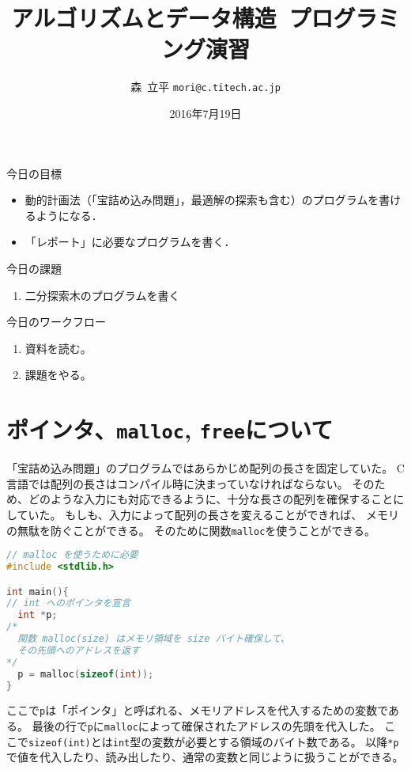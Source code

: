 \documentclass[a4paper,twoside,onecolumn,openany,article]{memoir}
\title{アルゴリズムとデータ構造~プログラミング演習}
\date{2016年7月19日}
\author{森~立平 \texttt{mori@c.titech.ac.jp}}
\theoremstyle{remark}
\begin{document}
\maketitle

\noindent
今日の目標
\begin{itemize}
\item 動的計画法（「宝詰め込み問題」，最適解の探索も含む）のプログラムを書けるようになる．
\item 「レポート」に必要なプログラムを書く．
\end{itemize}

\noindent
今日の課題
\begin{enumerate}
\item 二分探索木のプログラムを書く
\end{enumerate}

\vspace{.5em}
\noindent
今日のワークフロー
\begin{enumerate}
\item 資料を読む。
\item 課題をやる。
\end{enumerate}

\section{ポインタ、\texttt{malloc}, \texttt{free}について}
「宝詰め込み問題」のプログラムではあらかじめ配列の長さを固定していた。
C言語では配列の長さはコンパイル時に決まっていなければならない。
そのため、どのような入力にも対応できるように、十分な長さの配列を確保することにしていた。
もしも、入力によって配列の長さを変えることができれば、
メモリの無駄を防ぐことができる。
そのために関数\texttt{malloc}を使うことができる。

\begin{lstlisting}[basicstyle=\ttfamily\small,showstringspaces=false,language=C,frame=single]
// malloc を使うために必要
#include <stdlib.h>

int main(){
// int へのポインタを宣言
  int *p;
/*
  関数 malloc(size) はメモリ領域を size バイト確保して、
  その先頭へのアドレスを返す
*/
  p = malloc(sizeof(int));
}
\end{lstlisting}
ここで\texttt{p}は「ポインタ」と呼ばれる、メモリアドレスを代入するための変数である。
最後の行で\texttt{p}に\texttt{malloc}によって確保されたアドレスの先頭を代入した。
ここで\texttt{sizeof(int)}とは\texttt{int}型の変数が必要とする領域のバイト数である。
以降\texttt{*p}で値を代入したり、読み出したり、通常の変数と同じように扱うことができる。
\end{document}
